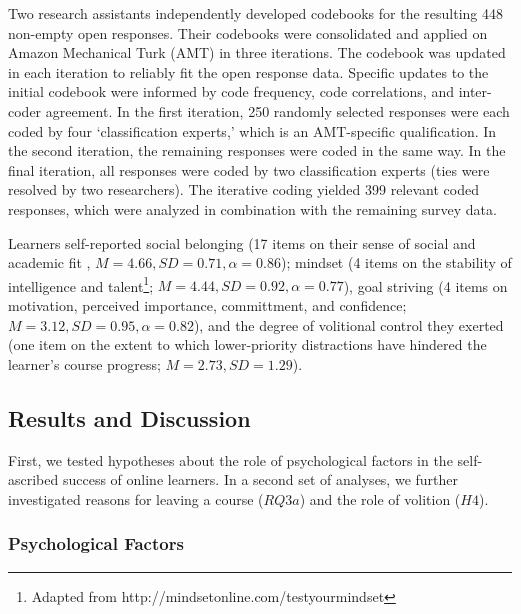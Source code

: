 \documentclass{sigchi}\usepackage[]{graphicx}\usepackage[]{color}
\begin{document}
Two research assistants independently developed codebooks for the resulting 448 non-empty open responses. Their codebooks were consolidated and applied on Amazon Mechanical Turk (AMT) in three iterations. The codebook was updated in each iteration to reliably fit the open response data. Specific updates to the initial codebook were informed by code frequency, code correlations, and inter-coder agreement. In the first iteration, 250 randomly selected responses were each coded by four `classification experts,' which is an AMT-specific qualification. In the second iteration, the remaining responses were coded in the same way. In the final iteration, all responses were coded by two classification experts (ties were resolved by two researchers). The iterative coding yielded 399 relevant coded responses, which were analyzed in combination with the remaining survey data.

Learners self-reported social belonging (17 items on their sense of social and academic fit \cite{walton2007question}, $M=4.66, SD=0.71, \alpha=0.86$); mindset (4 items on the stability of intelligence and talent\footnote{Adapted from http://mindsetonline.com/testyourmindset}; $M=4.44, SD=0.92, \alpha=0.77$), goal striving (4 items on motivation, perceived importance, committment, and confidence; $M=3.12, SD=0.95, \alpha=0.82$), and the degree of volitional control they exerted (one item on the extent to which lower-priority distractions have hindered the learner's course progress; $M=2.73, SD=1.29$).

\subsection{Results and Discussion}

First, we tested hypotheses about the role of psychological factors in the self-ascribed success of online learners. In a second set of analyses, we further investigated reasons for leaving a course ($RQ3a$) and the role of volition ($H4$).

\subsubsection{Psychological Factors}
\end{document}
